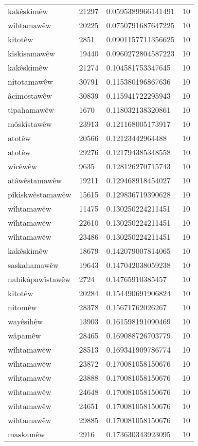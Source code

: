 \begin{longtable}{llll}
kakêskimêw & 21297 & 0.0595389966141491 & 10\\
wîhtamawêw & 20225 & 0.0750791687647225 & 10\\
kitotêw & 2851 & 0.0901157711356625 & 10\\
kîskisamawêw & 19440 & 0.0960272804587223 & 10\\
kakêskimêw & 21274 & 0.104581753347645 & 10\\
nitotamawêw & 30791 & 0.115380196867636 & 10\\
âcimostawêw & 30839 & 0.115941722295943 & 10\\
tipahamawêw & 1670 & 0.118032138320861 & 10\\
môskîstawêw & 23913 & 0.121168005173917 & 10\\
atotêw & 20566 & 0.12123442964488 & 10\\
atotêw & 29276 & 0.121794385348558 & 10\\
wîcêwêw & 9635 & 0.128126270715743 & 10\\
atâwêstamawêw & 19211 & 0.129468918454027 & 10\\
pîkiskwêstamawêw & 15615 & 0.129836719390628 & 10\\
wîhtamawêw & 11475 & 0.130250224211451 & 10\\
wîhtamawêw & 22610 & 0.130250224211451 & 10\\
wîhtamawêw & 23486 & 0.130250224211451 & 10\\
kakêskimêw & 18679 & 0.142079007814065 & 10\\
saskahamawêw & 19643 & 0.147042038059238 & 10\\
nahikâpawîstawêw & 2724 & 0.14765910385457 & 10\\
kitotêw & 20284 & 0.154490691906824 & 10\\
nitomêw & 28378 & 0.15671762026267 & 10\\
wayêsihêw & 13903 & 0.161598191090469 & 10\\
wâpamêw & 28465 & 0.169088726703779 & 10\\
wîhtamawêw & 28513 & 0.169341909786774 & 10\\
wîhtamawêw & 23872 & 0.170081058150676 & 10\\
wîhtamawêw & 23888 & 0.170081058150676 & 10\\
wîhtamawêw & 24648 & 0.170081058150676 & 10\\
wîhtamawêw & 24651 & 0.170081058150676 & 10\\
wîhtamawêw & 29885 & 0.170081058150676 & 10\\
maskamêw & 2916 & 0.173630343923095 & 10\\

\end{longtable}

